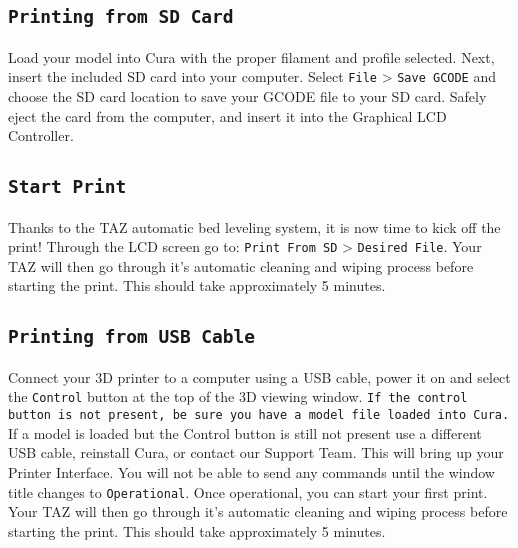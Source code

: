 \subsection{\texttt{Printing from SD Card}}

Load your model into Cura with the proper filament and profile selected. Next, insert the included SD card into your computer. Select \texttt{File} > \texttt{Save GCODE} and choose the SD card location to save your GCODE file to your SD card. Safely eject the card from the computer, and insert it into the Graphical LCD Controller. 



\subsection{\texttt{Start Print}}
Thanks to the TAZ automatic bed leveling system, it is now time to kick off the print! Through the LCD screen go to: \texttt{Print From SD} > \texttt{Desired File}. Your TAZ will then go through it's automatic cleaning and wiping process before starting the print. This should take approximately 5 minutes.


\subsection{\texttt{Printing from USB Cable}}

Connect your 3D printer to a computer using a USB cable, power it on and select the \texttt{Control} button at the top of the 3D viewing window. \texttt{If the control button is not present, be sure you have a model file loaded into Cura.} If a model is loaded but the Control button is still not present use a different USB cable, reinstall Cura, or contact our Support Team. This will bring up your Printer Interface. You will not be able to send any commands until the window title changes to \texttt{Operational}. Once operational, you can start your first print. Your TAZ will then go through it's automatic cleaning and wiping process before starting the print. This should take approximately 5 minutes.



